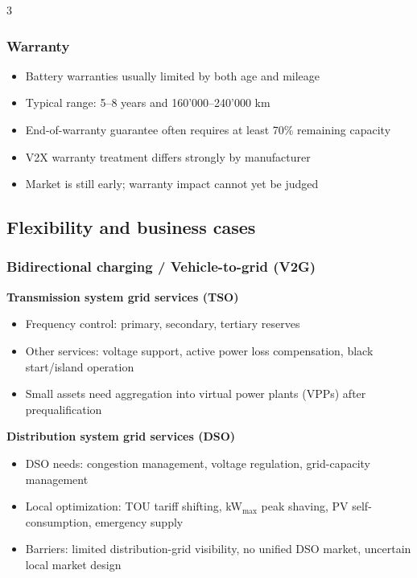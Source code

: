 \documentclass[9pt, landscape, a4paper]{article}
\begin{document}
\begin{multicols*}{3}
\subsubsection{Warranty}
\begin{itemize}
  \item Battery warranties usually limited by both age and mileage
  \item Typical range: 5--8 years and 160'000--240'000 km
  \item End-of-warranty guarantee often requires at least 70\% remaining capacity
  \item V2X warranty treatment differs strongly by manufacturer
  \item Market is still early; warranty impact cannot yet be judged
\end{itemize}

\subsection{Flexibility and business cases}
\subsubsection{Bidirectional charging / Vehicle-to-grid (V2G)}
\textbf{Transmission system grid services (TSO)}
\vspace*{-.2cm}
\begin{itemize}
  \item Frequency control: primary, secondary, tertiary reserves
  \item Other services: voltage support, active power loss compensation, black start/island operation
  \item Small assets need aggregation into virtual power plants (VPPs) after prequalification
\end{itemize}

\textbf{Distribution system grid services (DSO)}
\vspace*{-.2cm}
\begin{itemize}
  \item DSO needs: congestion management, voltage regulation, grid-capacity management
  \item Local optimization: TOU tariff shifting, kW$_\text{max}$ peak shaving, PV self-consumption, emergency supply
  \item Barriers: limited distribution-grid visibility, no unified DSO market, uncertain local market design
\end{itemize}


\end{multicols*}
\end{document}
